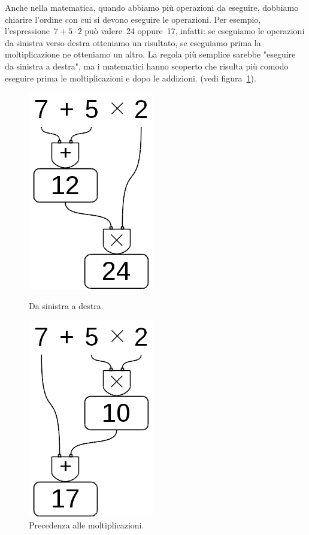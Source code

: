 Anche nella matematica, quando abbiamo più operazioni da eseguire, dobbiamo 
chiarire l'ordine con cui si devono eseguire le operazioni. 
Per esempio, l'espressione~\(7+5\cdot2\) può valere~24 oppure~17, infatti:
se eseguiamo le operazioni da sinistra verso destra otteniamo un risultato, 
se eseguiamo prima la moltiplicazione ne otteniamo un altro.
La regola più semplice sarebbe "eseguire da sinistra a destra", ma i 
matematici hanno scoperto che risulta più comodo eseguire prima le
moltiplicazioni e dopo le addizioni.
(vedi figura~\ref{fig:op_prec2}).

\begin{inaccessibleblock}[]
\begin{figure}[h]
 \centering
 \begin{minipage}[t]{.40\textwidth}
  \centering\includegraphics[scale=0.35]{img/op_prec1.png}
  \caption{Da sinistra a destra.}\label{fig:op_prec1}
 \end{minipage}\hfil
 \begin{minipage}[t]{.50\textwidth}
  \centering\includegraphics[scale=0.35]{img/op_prec2.png}
  \caption{Precedenza alle moltiplicazioni.}\label{fig:op_prec2}
 \end{minipage}
\end{figure}
\end{inaccessibleblock}
